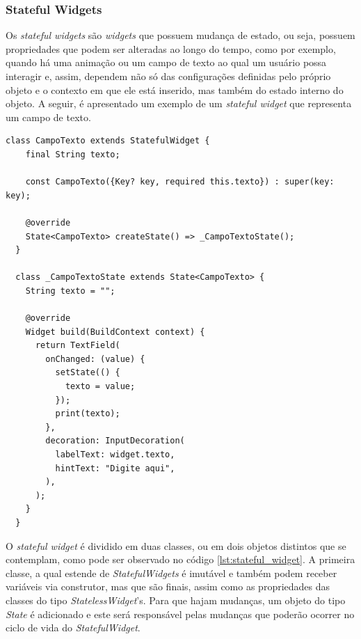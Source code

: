 \subsubsection{Stateful Widgets}

Os \textit{stateful widgets} são \textit{widgets} que possuem mudança de estado, ou seja, possuem propriedades que podem ser alteradas ao longo do tempo, como por exemplo, quando há uma animação ou um campo de texto ao qual um usuário possa interagir e, assim, dependem não só das configurações definidas pelo próprio objeto e o contexto em que ele está inserido, mas também do estado interno do objeto. A seguir, é apresentado um exemplo de um \textit{stateful widget} que representa um campo de texto.

\begin{lstlisting}[caption={Exemplo de um \textit{stateful widget} que representa um campo de texto.}, label={lst:stateful_widget}]
  class CampoTexto extends StatefulWidget {
    final String texto;

    const CampoTexto({Key? key, required this.texto}) : super(key: key);

    @override
    State<CampoTexto> createState() => _CampoTextoState();
  }

  class _CampoTextoState extends State<CampoTexto> {
    String texto = "";

    @override
    Widget build(BuildContext context) {
      return TextField(
        onChanged: (value) {
          setState(() {
            texto = value;
          });
          print(texto);
        },
        decoration: InputDecoration(
          labelText: widget.texto,
          hintText: "Digite aqui",
        ),
      );
    }
  }
\end{lstlisting}

O \textit{stateful widget} é dividido em duas classes, ou em dois objetos distintos que se contemplam, como pode ser observado no código \ref{lst:stateful_widget}.
A primeira classe, a qual estende de \textit{StatefulWidgets} é imutável e também podem receber variáveis via construtor, mas que são finais, assim como as propriedades das classes do tipo \textit{StatelessWidget}'s. Para que hajam mudanças, um objeto do tipo \textit{State} é adicionado e este será responsável pelas mudanças que poderão ocorrer no ciclo de vida do \textit{StatefulWidget}.

